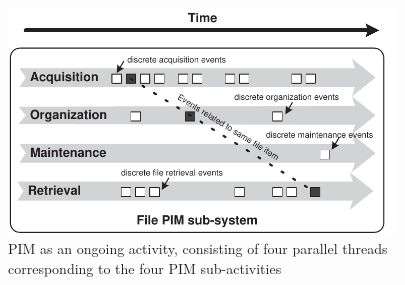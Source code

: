 \begin{figure}[hbtp]
	\begin{center}
		\leavevmode
		\includegraphics[height=6cm]{pictures/discussion/PIM-ongoing-model-SIMPLE.pdf}
	\end{center}
	\caption{PIM as an ongoing activity, consisting of four parallel threads corresponding to the four PIM sub-activities}
	\label{fig:discussion:ongoing-model-SIMPLE}
\end{figure}


